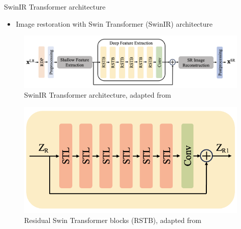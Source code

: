 \documentclass{beamer}
\begin{document}
\begin{frame}[t]{SwinIR Transformer architecture}
    \begin{itemize}
        \item Image restoration with Swin Transformer (SwinIR) architecture \cite{liang_swinir_2021}
    \end{itemize}
    
    \begin{figure}
        \hspace{-0.2cm}
        \centering
        \includegraphics[scale=.38]{MA_presentation/figures/swinir_architecture.png}
        \caption{SwinIR Transformer architecture, adapted from \cite{liang_swinir_2021}}
    \end{figure}


    \begin{figure}
        \centering
        \includegraphics[scale=.42]{MA_presentation/figures/rstb_block.png}
        \caption{Residual Swin Transformer blocks (RSTB), adapted from \cite{liang_swinir_2021}}
    \end{figure}

\end{frame}
\end{document}
